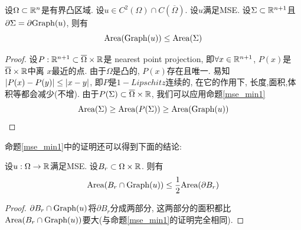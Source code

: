 \begin{proposition}\label{mse_min2}
    设$\Omega \subset \mathbb{R}^n$是有界凸区域. 设$u \in C^2(\Omega) \cap C(\overline{\Omega})$. 设$u$满足MSE. 设$\Sigma\subset \mathbb{R}^{n+1}$且$\partial \Sigma = \partial \text{Graph}(u)$, 则有
    \begin{equation}
        \text{Area}(\text{Graph}(u)) \le \text{Area}(\Sigma)
    \end{equation}
\end{proposition}
\begin{proof}
    设$P:\mathbb{R}^{n+1} \subset \overline{\Omega} \times \mathbb{R}$是 nearest point projection, 即$\forall x \in \mathbb{R}^{n+1}$, $P(x)$是$\overline{\Omega}\times \mathbb{R}$中离 $x$最近的点. 由于$\Omega$是凸的, $P(x)$存在且唯一. 易知$\left | P(x)-P(y) \right | \le \left | x-y \right |$, 即$P$是$1-Lipschitz$连续的, 在它的作用下, 长度,面积,体积等都会减少(不增). 由于$P(\Sigma) \subset \overline{\Omega} \times \mathbb{R}$, 我们可以应用命题\eqref{mse_min1}
    \begin{equation}
        \text{Area}(\Sigma) \ge \text{Area}(P(\Sigma)) \ge \text{Area}(\text{Graph}(u))
    \end{equation}
\end{proof}
命题\eqref{mse_min1}中的证明还可以得到下面的结论:
\begin{corollary}
    设$u: \Omega \to \mathbb{R}$满足MSE. 设$B_r \subset \Omega \times \mathbb{R}$. 则有
    \begin{equation}
        \text{Area}(B_r \cap \text{Graph}(u)) \le \frac{1}{2} \text{Area}(\partial B_r)
    \end{equation}
\end{corollary}
\begin{proof}
    $\partial B_r \cap \text{Graph}(u)$将$\partial B_r$分成两部分, 这两部分的面积都比$\text{Area}(B_r\cap \text{Graph}(u))$要大(与命题\eqref{mse_min1}的证明完全相同).
\end{proof}
